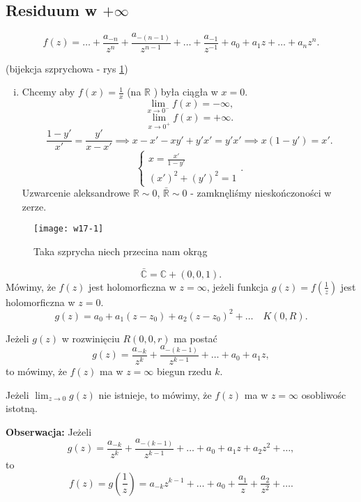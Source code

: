 \documentclass[../main.tex]{subfiles}
\begin{document}
\subsection{Residuum w $+\infty$ }
\[
    f(z) = \ldots + \frac{a_{-n}}{z^n} + \frac{a_{-(n-1)}}{z^{n-1}} + \ldots + \frac{a_{-1}}{z^{-1}} + a_0 + a_1 z + \ldots + a_n z^n
.\]
\begin{przyklad}(bijekcja szprychowa - rys \ref{fig:w17-1})
    \begin{enumerate}[i)]
        \item  Chcemy aby $f(x) = \frac{1}{x}$ (na $\mathbb{R}$ ) była ciągła w $x = 0$.
            \[
                \lim\limits_{x\to 0^-}f(x) = -\infty
            ,\]
        \[
            \lim_{x \to 0^+}f(x) = +\infty
        .\]
    \[
        \frac{1-y'}{x'} = \frac{y'}{x - x'} \implies x - x' - xy' + y'x' = y'x' \implies x(1-y') = x'
    .\]
\[
\begin{cases}
    x = \frac{x'}{1-y'}\\ \left(x'\right)^2 + \left(y'\right)^2 = 1
\end{cases}
.\]
Uzwarcenie aleksandrowe $\mathbb{R}\sim 0$, $\bar{\mathbb{R}} \sim 0$ - zamknęliśmy nieskończoności w zerze.
    \end{enumerate}
    \begin{figure}[h]
        \centering
        \texttt{[image: w17-1]}
        \caption{Taka szprycha niech przecina nam okrąg}
        \label{fig:w17-1}
    \end{figure}
\end{przyklad}

\pagebreak
\begin{definicja}
    \[
        \bar{\mathbb{C}} = \mathbb{C} + (0,0,1)
    .\]
Mówimy, że $f(z)$ jest holomorficzna w $z = \infty$, jeżeli funkcja $g(z) = f(\frac{1}{z})$ jest holomorficzna w $z = 0$.
 \[
     g(z) = a_0 + a_1(z-z_0) + a_2(z-z_0)^2 + \ldots \quad K(0,R)
.\]
\end{definicja}
\begin{definicja}
Jeżeli  $g(z)$ w rozwinięciu $R(0,0,r)$ ma postać
\[
    g(z) = \frac{a_{-k}}{z^k} + \frac{a_{-(k-1)}}{z^{k-1}} + \ldots + a_0 + a_1z
,\]
to mówimy, że $f(z)$ ma w $z = \infty$ biegun rzedu $k$.
\end{definicja}
\begin{definicja}
    Jeżeli $\lim_{z \to 0}g(z)$ nie istnieje, to mówimy, że $f(z)$ ma w $z = \infty$ osobliwośc istotną.
\end{definicja}
\textbf{Obserwacja:} Jeżeli
\[
    g(z) = \frac{a_{-k}}{z^k} + \frac{a_{-(k-1)}}{z^{k-1}} + \ldots + a_0 + a_1z + a_2z^2 + \ldots
,\]
to
\[
    f(z) = g\left(\frac{1}{z}\right) = a_{-k}z^{k-1} + \ldots + a_0 + \frac{a_1}{z} + \frac{a_2}{z^2} + \ldots
.\]
\end{document}
